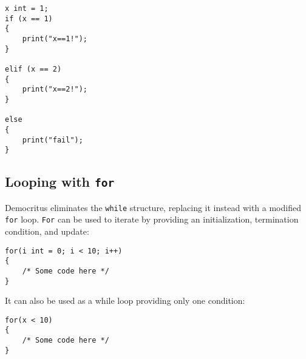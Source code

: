             \begin{lstlisting}
x int = 1;
if (x == 1)
{
    print("x==1!");
}

elif (x == 2)
{
    print("x==2!");
}

else 
{
    print("fail");
}
            \end{lstlisting}

        \subsection{Looping with \texttt{for}}
            Democritus eliminates the \texttt{while} structure, replacing it instead with a modified \texttt{for} loop. \texttt{For} can be used to iterate by providing an initialization, termination condition, and update:
            \begin{lstlisting}
for(i int = 0; i < 10; i++)
{
    /* Some code here */
}
            \end{lstlisting}

            It can also be used as a while loop providing only one condition:

            \begin{lstlisting}
for(x < 10)
{
    /* Some code here */
}
            \end{lstlisting}


